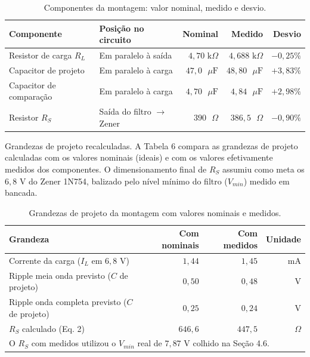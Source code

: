 \documentclass[11pt,a4paper]{article}
\begin{document}
\begin{table}[H]
    \centering
    \caption{Componentes da montagem: valor nominal, medido e desvio.}
    \vspace{2pt}
    \renewcommand{\arraystretch}{1.2}
    \begin{tabular}{@{}llrrr@{}}
    \toprule
    \textbf{Componente} & \textbf{Posição no circuito} & \textbf{Nominal} & \textbf{Medido} & \textbf{Desvio} \\
    \midrule
    Resistor de carga $R_L$ & Em paralelo à saída & $4{,}70\text{ k}\Omega$ & $4{,}688\text{ k}\Omega$ & $-0{,}25\%$ \\
    Capacitor de projeto & Em paralelo à carga & $47{,}0\text{ }\mu\text{F}$ & $48{,}80\text{ }\mu\text{F}$ & $+3{,}83\%$ \\
    Capacitor de comparação & Em paralelo à carga & $4{,}70\text{ }\mu\text{F}$ & $4{,}84\text{ }\mu\text{F}$ & $+2{,}98\%$ \\
    Resistor $R_S$ & Saída do filtro $\to$ Zener & $390\text{ }\Omega$ & $386{,}5\text{ }\Omega$ & $-0{,}90\%$ \\
    \bottomrule
    \end{tabular}
\end{table}

Grandezas de projeto recalculadas. A Tabela 6 compara as grandezas de projeto calculadas com os valores nominais (ideais) e com os valores efetivamente medidos dos componentes. O dimensionamento final de $R_S$ assumiu como meta os $6{,}8\text{ V}$ do Zener 1N754, balizado pelo nível mínimo do filtro ($V_{min}$) medido em bancada.

\begin{table}[H]
    \centering
    \caption{Grandezas de projeto da montagem com valores nominais e medidos.}
    \vspace{2pt}
    \renewcommand{\arraystretch}{1.2}
    \begin{tabular}{@{}lrrr@{}}
    \toprule
    \textbf{Grandeza} & \textbf{Com nominais} & \textbf{Com medidos} & \textbf{Unidade} \\
    \midrule
    Corrente da carga ($I_L$ em $6{,}8\text{ V}$) & $1{,}44$ & $1{,}45$ & mA \\
    Ripple meia onda previsto ($C$ de projeto) & $0{,}50$ & $0{,}48$ & V \\
    Ripple onda completa previsto ($C$ de projeto) & $0{,}25$ & $0{,}24$ & V \\
    $R_S$ calculado (Eq. 2) & $646{,}6$ & $447{,}5$ & $\Omega$ \\
    \bottomrule
    \multicolumn{4}{l}{\footnotesize O $R_S$ com medidos utilizou o $V_{min}$ real de $7{,}87\text{ V}$ colhido na Seção 4.6.}
    \end{tabular}
\end{table}
\end{document}
